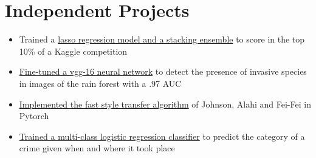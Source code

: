 \documentclass[10pt]{article}
\begin{document}
	\section{Independent Projects}
		\begin{itemize}[noitemsep]
			\item Trained a \href{https://github.com/ryankresse/ames_housing}{lasso regression model and a stacking ensemble} to score in the top 10\% of a Kaggle competition
			\item \href{https://github.com/ryankresse/invasive_species}{Fine-tuned a vgg-16 neural network} to detect the presence of invasive species in images of the rain forest with a .97 AUC
			\item \href{https://github.com/ryankresse/fast_style_transfer_pytorch}{Implemented the fast style transfer algorithm} of Johnson, Alahi and Fei-Fei in Pytorch
			\item \href{https://github.com/ryankresse/sf-crime}{Trained a multi-class logistic regression classifier} to predict the category of a crime given when and where it took place
		\end{itemize}
		\begin{comment}
		\begin{itemize}[noitemsep]
			\item Fast-style transfer
				\begin{itemize}[noitemsep]
					\item Implemented the fast-style transfer algorithm of .. in pytorch
				\end{itemize}
			\item Ames Housing Predictions
				\begin{itemize}[noitemsep]
					\item Trained .. to predict housing prices in Ames Iowa
				\end{itemize}
			\item Invasive species image classification
				\begin{itemize}[noitemsep]
					\item Trained a convolutional neural network to detect whether invasive species in images of the rain forest
				\end{itemize}
					
			\item San Francisco Crime
				\begin{itemize}[noitemsep]
					\item Predicted the category of individual crimes given attributes like where and when they occurred
				\end{itemize}			
		\end{itemize}
		\end{comment}
\end{document}
